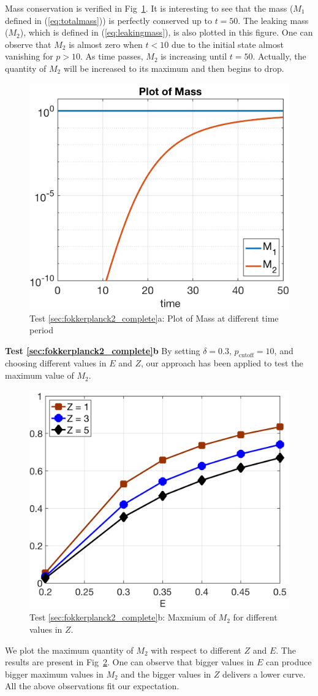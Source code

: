 \documentclass[preprint,11pt]{elsarticle}
\begin{document}
Mass conservation is verified in Fig~\ref{fig:MassPlot}.
It is interesting to see that the mass ($M_1$ defined in (\ref{eq:totalmass})) is perfectly conserved up to $t = 50$. The leaking mass ($M_2$), which is defined in (\ref{eq:leakingmass}), is also plotted in this figure. One can observe that $M_2$ is almost zero when $t<10$ due to the initial state almost vanishing for $p>10$. As time passes, $M_2$ is increasing until $t = 50$. Actually, the quantity of $M_2$ will be increased to its maximum and then begins to drop. 
\begin{figure}[H]
    \centering
    \includegraphics[width=.5\textwidth]{Fig_2D/MassPlot}
    \caption{Test \ref{sec:fokkerplanck2_complete}a: Plot of Mass at different time period}
    \label{fig:MassPlot}
\end{figure}

{\bf Test \ref{sec:fokkerplanck2_complete}b} 
By setting $\delta = 0.3$, $p_\text{cutoff} = 10$, and choosing different values in $E$ and $Z$, our approach has been applied to test the maximum value of $M_2$. 
\begin{figure}[H]
    \centering
    \includegraphics[width=.5\textwidth]{./Fig_2D/Rate-Del3e-1}
    \caption{Test \ref{sec:fokkerplanck2_complete}b: Maxmium of $M_2$ for different values in $Z$.}
    \label{fig:maxM2}
\end{figure}

We plot the maximum quantity of $M_2$ with respect to different $Z$ and $E$. The results are present in Fig~\ref{fig:maxM2}. One can observe that bigger values in $E$ can produce bigger maximum values in $M_2$ and the bigger values in $Z$ delivers a lower curve. All the above observations fit our expectation.
\end{document}
